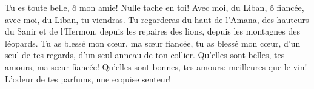 Tu es toute belle, ô mon amie! Nulle tache en toi!
	Avec moi, du Liban, ô fiancée, avec moi, du Liban, tu viendras.
Tu regarderas du haut de l’Amana, des hauteurs du Sanir et de l’Hermon,
	depuis les repaires des lions, depuis les montagnes des léopards.
Tu as blessé mon cœur, ma sœur fiancée,
	tu as blessé mon cœur, d’un seul de tes regards,
		d’un seul anneau de ton collier.
Qu’elles sont belles, tes amours, ma sœur fiancée!
	Qu’elles sont bonnes, tes amours: meilleures que le vin!
	L’odeur de tes parfums, une exquise senteur!

